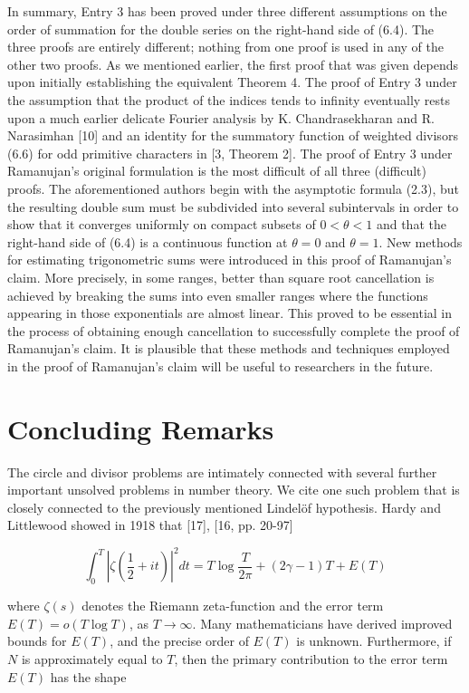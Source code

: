 \documentclass[10pt]{article}
\theoremstyle{plain}
\begin{document}
In summary, Entry 3 has been proved under three different assumptions on the order of summation for the double series on the right-hand side of (6.4). The three proofs are entirely different; nothing from one proof is used in any of the other two proofs. As we mentioned earlier, the first proof that was given depends upon initially establishing the equivalent Theorem 4. The proof of Entry 3 under the assumption that the product of the indices tends to infinity eventually rests upon a much earlier delicate Fourier analysis by K. Chandrasekharan and R. Narasimhan [10] and an identity for the summatory function of weighted divisors (6.6) for odd primitive characters in [3, Theorem 2]. The proof of Entry 3 under Ramanujan's original formulation is the most difficult of all three (difficult) proofs. The aforementioned authors begin with the asymptotic formula (2.3), but the resulting double sum must be subdivided into several subintervals in order to show that it converges uniformly on compact subsets of $0<\theta<1$ and that the right-hand side of (6.4) is a continuous function at $\theta=0$ and $\theta=1$. New methods for estimating trigonometric sums were introduced in this proof of Ramanujan's claim. More precisely, in some ranges, better than square root cancellation is achieved by breaking the sums into even smaller ranges where the functions appearing in those exponentials are almost linear. This proved to be essential in the process of obtaining enough cancellation to successfully complete the proof of Ramanujan's claim. It is plausible that these methods and techniques employed in the proof of Ramanujan's claim will be useful to researchers in the future.

\section{Concluding Remarks}

The circle and divisor problems are intimately connected with several further important unsolved problems in number theory. We cite one such problem that is closely connected to the previously mentioned Lindelöf hypothesis. Hardy and Littlewood showed in 1918 that [17], [16, pp. 20-97]


\begin{equation*}
\int_{0}^{T}\left|\zeta\left(\frac{1}{2}+i t\right)\right|^{2} d t=T \log \frac{T}{2 \pi}+(2 \gamma-1) T+E(T) \tag{7.1}
\end{equation*}


where $\zeta(s)$ denotes the Riemann zeta-function and the error term $E(T)=o(T \log T)$, as $T \to \infty$. Many mathematicians have derived improved bounds for $E(T)$, and the precise order of $E(T)$ is unknown. Furthermore, if $N$ is approximately equal to $T$, then the primary contribution to the error term $E(T)$ has the shape
\end{document}
